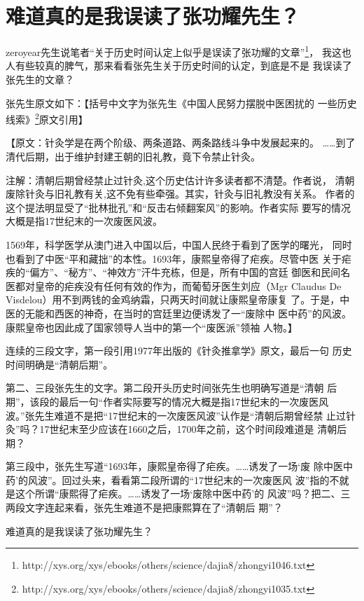 \section{难道真的是我误读了张功耀先生？}
zeroyear先生说笔者“关于历史时间认定上似乎是误读了张功耀的文章”\footnote{http://xys.org/xys/ebooks/others/science/dajia8/zhongyi1046.txt}，
我这也人有些较真的脾气，那来看看张先生关于历史时间的认定，到底是不是
我误读了张先生的文章？

张先生原文如下：【括号中文字为张先生《中国人民努力摆脱中医困扰的
一些历史线索》\footnote{http://xys.org/xys/ebooks/others/science/dajia8/zhongyi1035.txt}原文引用】

【原文：针灸学是在两个阶级、两条道路、两条路线斗争中发展起来的。
……到了清代后期，出于维护封建王朝的旧礼教，竟下令禁止针灸。

注解：清朝后期曾经禁止过针灸,这个历史估计许多读者都不清楚。作者说，
清朝废除针灸与旧礼教有关,这不免有些牵强。其实，针灸与旧礼教没有关系。
作者的这个提法明显受了“批林批孔”和“反击右倾翻案风”的影响。作者实际
要写的情况大概是指17世纪末的一次废医风波。

1569年，科学医学从澳门进入中国以后，中国人民终于看到了医学的曙光，
同时也看到了中医“平和藏拙”的本性。1693年，康熙皇帝得了疟疾。尽管中医
关于疟疾的“偏方”、“秘方”、“神效方”汗牛充栋，但是，所有中国的宫廷
御医和民间名医都对皇帝的疟疾没有任何有效的作为，而葡萄牙医生刘应（Mgr
Claudus De Visdelou）用不到两钱的金鸡纳霜，只两天时间就让康熙皇帝康复
了。于是，中医的无能和西医的神奇，在当时的宫廷里边便诱发了一“废除中
医中药”的风波。康熙皇帝也因此成了国家领导人当中的第一个“废医派”领袖
人物。】

连续的三段文字，第一段引用1977年出版的《针灸推拿学》原文，最后一句
历史时间明确是“清朝后期”。

第二、三段张先生的文字。第二段开头历史时间张先生也明确写道是“清朝
后期”，该段的最后一句“作者实际要写的情况大概是指17世纪末的一次废医风
波。”张先生难道不是把“17世纪末的一次废医风波”认作是“清朝后期曾经禁
止过针灸”吗？17世纪末至少应该在1660之后，1700年之前，这个时间段难道是
清朝后期？

第三段中，张先生写道“1693年，康熙皇帝得了疟疾。……诱发了一场‘废
除中医中药’的风波”。回过头来，看看第二段所谓的“17世纪末的一次废医风
波”指的不就是这个所谓“康熙得了疟疾。……诱发了一场‘废除中医中药’的
风波”吗？把二、三两段文字连起来看，张先生难道不是把康熙算在了“清朝后
期”？

难道真的是我误读了张功耀先生？